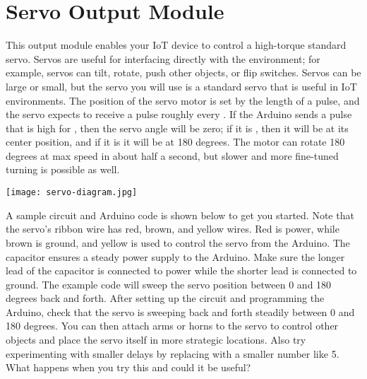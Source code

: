 
\clearpage
\section{Servo Output Module}
\label{sec-output-servo}

This output module enables your IoT device to control a high-torque
standard servo. Servos are useful for interfacing directly with the
environment; for example, servos can tilt, rotate, push other objects,
or flip switches. Servos can be large or small, but the servo you will
use is a standard servo that is useful in IoT environments. The position
of the servo motor is set by the length of a pulse, and the servo
expects to receive a pulse roughly every . If the Arduino
sends a pulse that is high for , then the servo angle will be
zero; if it is , then it will be at its center position, and
if it is  it will be at 180 degrees. The motor can rotate 180
degrees at max speed in about half a second, but slower and more
fine-tuned turning is possible as well.

\vspace{0.1in}
{
  \centering
    \texttt{[image: servo-diagram.jpg]}

}
\vspace{0.1in}

A sample circuit and Arduino code is shown below to get you started.
Note that the servo's ribbon wire has red, brown, and yellow wires. Red
is power, while brown is ground, and yellow is used to control the servo
from the Arduino. The  capacitor ensures a steady power
supply to the Arduino. Make sure the longer lead of the capacitor is
connected to power while the shorter lead is connected to ground.  The
example code will sweep the servo position between 0 and 180 degrees
back and forth. After setting up the circuit and programming the
Arduino, check that the servo is sweeping back and forth steadily
between 0 and 180 degrees. You can then attach arms or horns to the
servo to control other objects and place the servo itself in more
strategic locations. Also try experimenting with smaller delays by
replacing  with a smaller number like 5. What happens when
you try this and could it be useful?

